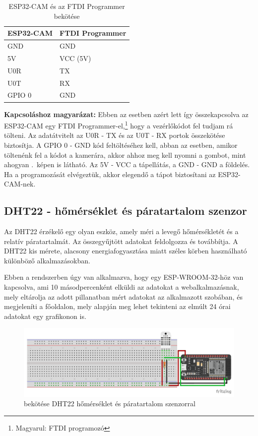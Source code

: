 \documentclass[
]{thesis-ekf}
\theoremstyle{definition}
\theoremstyle{remark}
\begin{document}
	\begin{table}[ht!]
		\centering
		\begin{tabular}{|l|l|}
			\hline
			\textbf{ESP32-CAM} &  \textbf{FTDI Programmer} \\ \hline
			GND & GND \\ \hline
			5V  & VCC (5V) \\ \hline
			U0R & TX \\ \hline
			U0T & RX \\ \hline
			GPIO 0 & GND \\ \hline
		\end{tabular}
	\caption{ESP32-CAM és az FTDI Programmer bekötése}
	\label{esp32-cam-connection-table}
	\end{table}

	\textbf{Kapcsoláshoz magyarázat:}
	Ebben az esetben azért lett így összekapcsolva az ESP32-CAM egy FTDI Programmer-el,\footnote{Magyarul: FTDI programozó} hogy a vezérlőkódot fel tudjam rá tölteni. Az adatátvitelt az U0R - TX és az U0T - RX portok összekötése biztosítja. A GPIO 0 - GND kód feltöltéséhez kell, abban az esetben, amikor töltenénk fel a kódot a kamerára, akkor ahhoz meg kell nyomni a gombot, mint ahogyan .~képen is látható. Az 5V - VCC a tápellátás, a GND - GND a földelés. Ha a programozását elvégeztük, akkor elegendő a tápot biztosítani az ESP32-CAM-nek.
	
	\subsection{DHT22 - hőmérséklet és páratartalom szenzor}
	
	Az DHT22 érzékelő egy olyan eszköz, amely méri a levegő hőmérsékletét és a relatív  páratartalmát. Az összegyűjtött adatokat feldolgozza és továbbítja. A DHT22 kis mérete, alacsony energiafogyasztása miatt széles körben használható különböző alkalmazásokban.\cite{dht22}
	
	Ebben a rendszerben úgy van alkalmazva, hogy egy ESP-WROOM-32-höz van kapcsolva, ami 10 másodpercenként elküldi az adatokat a webalkalmazásnak, mely eltárolja az adott pillanatban mért adatokat az alkalmazott szobában, és megjeleníti a főoldalon, mely alapján meg lehet tekinteni az elmúlt 24 órai adatokat egy grafikonon is.
		\begin{figure}[ht!]
		\centering
		\includegraphics[width=1\textwidth]{./src/schematics/temperature and humidity sensor_bb}
		\caption{ bekötése DHT22 hőmérséklet és páratartalom szenzorral}
		\label{dht22-schematics}
	\end{figure}	
\end{document}
